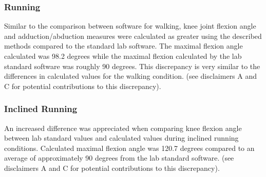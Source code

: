 \documentclass[10pt]{IEEEtran}
\begin{document}
    \subsubsection{Running}
    Similar to the comparison between software for walking, knee joint flexion angle and adduction/abduction measures were calculated as greater using the described methods compared to the standard lab software. The maximal flexion angle calculated was 98.2 degrees while the maximal flexion calculated by the lab standard software was roughly 90 degrees. This discrepancy is very similar to the differences in calculated values for the walking condition. (see disclaimers A and C for potential contributions to this discrepancy).
    \subsubsection{Inclined Running}
    An increased difference was appreciated when comparing knee flexion angle between lab standard values and calculated values during inclined running conditions. Calculated maximal flexion angle was 120.7 degrees compared to an average of approximately 90 degrees from the lab standard software. (see disclaimers A and C for potential contributions to this discrepancy).
    \newline \newline \newline
    \newline \newline \newline
\end{document}
